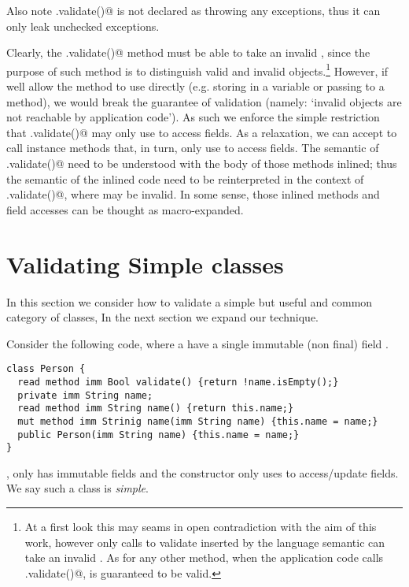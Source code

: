 \noindent Also note \Q@.validate()@ is not declared as throwing any exceptions, thus it can only leak unchecked exceptions.


Clearly, the \Q@.validate()@ method must be able to take an invalid \Q@this@, since the purpose of such method is to distinguish valid and invalid objects.\footnote{
At a first look this may seams in open contradiction
with the aim of this work, however only calls to validate inserted by the language semantic can take an invalid \Q@this@. As for any other method, when the application code calls \Q@.validate()@,
\Q@this@ is guaranteed to be valid.
}%
However, if well allow the method to use \Q@this@ directly (e.g. storing in a variable or passing to a method), we would break the guarantee of validation (namely: `invalid objects are not reachable by application code'). As such we enforce the simple restriction that \Q@.validate()@ may only use \Q@this@ to access fields.
As a relaxation, we can accept to call instance methods that, in turn, only use \Q@this@ to access fields.
The semantic of \Q@.validate()@ need to be understood with the body of those methods inlined; thus the semantic of the inlined code need to be reinterpreted in the context of \Q@.validate()@, where \Q@this@ may be invalid.
In some sense, those inlined methods and field accesses can be thought as macro-expanded.


%

\section{Validating Simple classes}
In this section we consider how to validate a simple but useful and common category of classes, In the next section we expand our technique.

Consider the following code, where a \Q@Person@ have a single immutable (non final) field \Q@name@.
\begin{lstlisting}
class Person {
  read method imm Bool validate() {return !name.isEmpty();}
  private imm String name;
  read method imm String name() {return this.name;}
  mut method imm Strinig name(imm String name) {this.name = name;}
  public Person(imm String name) {this.name = name;}
}
\end{lstlisting}
\Q@Person@, only has immutable fields and the constructor only uses \Q@this@ to access/update fields. We say such a class is \emph{simple}.%

